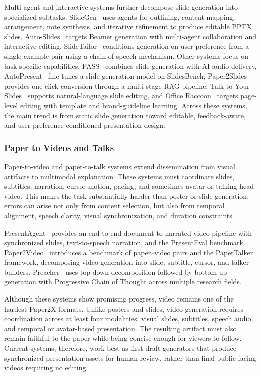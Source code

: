 \documentclass{llmxive}
\begin{document}
Multi-agent and interactive systems further decompose slide generation into specialized subtasks. SlideGen~\cite{slidegen2025} uses agents for outlining, content mapping, arrangement, note synthesis, and iterative refinement to produce editable PPTX slides. Auto-Slides~\cite{autoslides2025} targets Beamer generation with multi-agent collaboration and interactive editing. SlideTailor~\cite{slidetailor2025} conditions generation on user preference from a single example pair using a chain-of-speech mechanism. Other systems focus on task-specific capabilities: PASS~\cite{pass2025} combines slide generation with AI audio delivery, AutoPresent~\cite{autopresent2025} fine-tunes a slide-generation model on SlidesBench, Paper2Slides~\cite{paper2slides2025} provides one-click conversion through a multi-stage RAG pipeline, Talk to Your Slides~\cite{talkslides2025} supports natural-language slide editing, and Office Raccoon~\cite{sensetime2026} targets page-level editing with template and brand-guideline learning. Across these systems, the main trend is from static slide generation toward editable, feedback-aware, and user-preference-conditioned presentation design.



\subsubsection{Paper to Videos and Talks}
\label{sec:paper2video}

Paper-to-video and paper-to-talk systems extend dissemination from visual artifacts to multimodal explanation. These systems must coordinate slides, subtitles, narration, cursor motion, pacing, and sometimes avatar or talking-head video. This makes the task substantially harder than poster or slide generation: errors can arise not only from content selection, but also from temporal alignment, speech clarity, visual synchronization, and duration constraints.

PresentAgent~\cite{presentagent2025} provides an end-to-end document-to-narrated-video pipeline with synchronized slides, text-to-speech narration, and the PresentEval benchmark. Paper2Video~\cite{paper2video2025} introduces a benchmark of paper--video pairs and the PaperTalker framework, decomposing video generation into slide, subtitle, cursor, and talker builders. Preacher~\cite{preacher2025} uses top-down decomposition followed by bottom-up generation with Progressive Chain of Thought across multiple research fields.

Although these systems show promising progress, video remains one of the hardest Paper2X formats. Unlike posters and slides, video generation requires coordination across at least four modalities: visual slides, subtitles, speech audio, and temporal or avatar-based presentation. The resulting artifact must also remain faithful to the paper while being concise enough for viewers to follow. Current systems, therefore, work best as first-draft generators that produce synchronized presentation assets for human review, rather than final public-facing videos requiring no editing.
\end{document}
